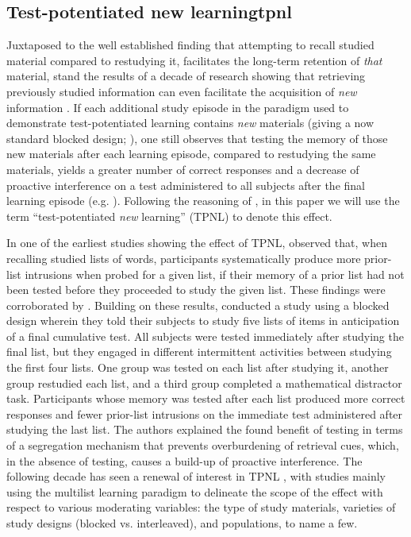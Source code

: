 \documentclass[../main.tex]{subfiles}
\begin{document}
\hypertarget{tpnl}{%
\subsection{Test-potentiated new learningtpnl}}

Juxtaposed to the well established finding that attempting to recall studied material compared to restudying it, facilitates the long-term retention of \textit{that} material, stand the results of a decade of research showing that retrieving previously studied information can even facilitate the acquisition of \textit{new} information \citep{chanRetrievalPotentiatesNew2018, yangEnhancingLearningRetrieval2018}. If each additional study episode in the paradigm used to demonstrate test-potentiated learning contains \textit{new} materials (giving a now standard blocked design; \cite{chanTestingPotentiatesNew2018}), one still observes that testing the memory of those new materials after each learning episode, compared to restudying the same materials, yields a greater number of correct responses and a decrease of proactive interference on a test administered to all subjects after the final learning episode (e.g. \citealp{szpunarInterpolatedMemoryTests2013, szpunarTestingStudyInsulates2008, wissmanInterimTestEffect2011}). Following the reasoning of \cite{chanRetrievalPotentiatesNew2018}, in this paper we will use the term ``test-potentiated \textit{new} learning'' (TPNL) to denote this effect.

In one of the earliest studies showing the effect of TPNL, \cite{darleyEffectsPriorFree1971} observed that, when recalling studied lists of words, participants systematically produce more prior-list intrusions when probed for a given list, if their memory of a prior list had not been tested before they proceeded to study the given list. These findings were corroborated by \cite{tulvingNegativeTransferEffects1974}. Building on these results, \cite{szpunarTestingStudyInsulates2008} conducted a study using a blocked design wherein they told their subjects to study five lists of items in anticipation of a final cumulative test. All subjects were tested immediately after studying the final list, but they engaged in different intermittent activities between studying the first four lists. One group was tested on each list after studying it, another group restudied each list, and a third group completed a mathematical distractor task. Participants whose memory was tested after each list produced more correct responses and fewer prior-list intrusions on the immediate test administered after studying the last list. The authors explained the found benefit of testing in terms of a segregation mechanism that prevents overburdening of retrieval cues, which, in the absence of testing, causes a build-up of proactive interference. The following decade has seen a renewal of interest in TPNL \citep{chanRetrievalPotentiatesNew2018, pastotterRetrievalPracticeEnhances2014, yangEnhancingLearningRetrieval2018}, with studies mainly using the multilist learning paradigm to delineate the scope of the effect with respect to various moderating variables: the type of study materials, varieties of study designs (blocked vs. interleaved), and populations, to name a few. 
\end{document}
